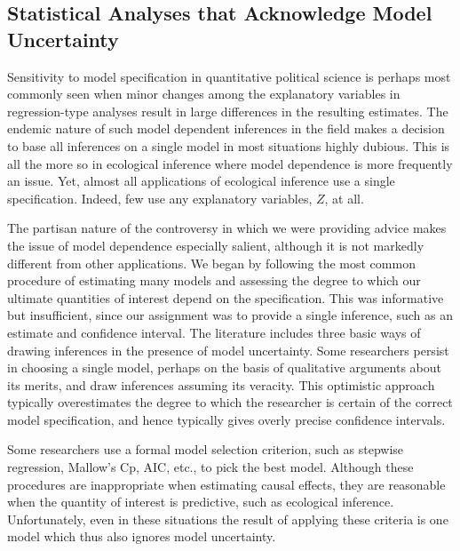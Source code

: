 \documentclass[11pt,titlepage]{article}
\begin{document}
\subsection{Statistical Analyses that Acknowledge Model Uncertainty}\label{s:multmodel}

Sensitivity to model specification in quantitative political science
is perhaps most commonly seen when minor changes among the explanatory
variables in regression-type analyses result in large differences in
the resulting estimates.  The endemic nature of such model dependent
inferences in the field makes a decision to base all inferences on a
single model in most situations highly dubious.  This is all the more
so in ecological inference where model dependence is more frequently
an issue.  Yet, almost all applications of ecological inference use a
single specification.  Indeed, few use any explanatory variables, $Z$,
at all.

The partisan nature of the controversy in which we were providing
advice makes the issue of model dependence especially salient,
although it is not markedly different from other applications.  We
began by following the most common procedure of estimating many models
and assessing the degree to which our ultimate quantities of interest
depend on the specification.  This was informative but insufficient,
since our assignment was to provide a single inference, such as an
estimate and confidence interval.  The literature includes three basic
ways of drawing inferences in the presence of model uncertainty.  Some
researchers persist in choosing a single model, perhaps on the basis
of qualitative arguments about its merits, and draw inferences
assuming its veracity.  This optimistic approach typically
overestimates the degree to which the researcher is certain of the
correct model specification, and hence typically gives overly precise
confidence intervals.

Some researchers use a formal model selection criterion, such as
stepwise regression, Mallow's Cp, AIC, etc., to pick the best model.
Although these procedures are inappropriate when estimating causal
effects, they are reasonable when the quantity of interest is
predictive, such as ecological inference.  Unfortunately, even in
these situations the result of applying these criteria is one model
which thus also ignores model uncertainty.
\end{document}
